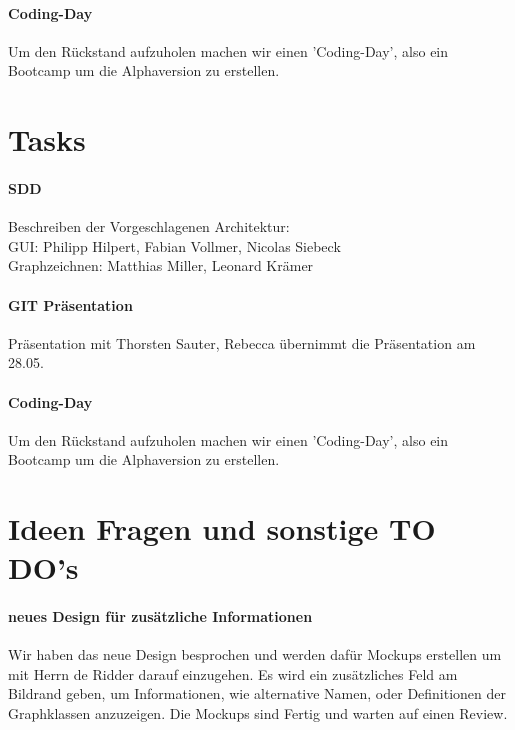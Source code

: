 \documentclass{scrartcl}
\begin{document}
\paragraph{Coding-Day} Um den Rückstand aufzuholen machen wir einen 'Coding-Day', also ein Bootcamp um die Alphaversion zu erstellen.
\section{Tasks}
\paragraph{SDD} Beschreiben der Vorgeschlagenen Architektur: \\ GUI: Philipp Hilpert, Fabian Vollmer, Nicolas Siebeck\\ 
Graphzeichnen: Matthias Miller, Leonard Krämer

\paragraph{GIT Präsentation} Präsentation mit Thorsten Sauter, Rebecca übernimmt die Präsentation am 28.05.
\paragraph{Coding-Day} Um den Rückstand aufzuholen machen wir einen 'Coding-Day', also ein Bootcamp um die Alphaversion zu erstellen.
\section{Ideen Fragen und sonstige TO DO's}
\paragraph{neues Design für zusätzliche Informationen} Wir haben das neue Design besprochen und werden dafür Mockups erstellen um mit Herrn de Ridder darauf einzugehen. Es wird ein zusätzliches Feld am Bildrand geben, um Informationen, wie alternative Namen, oder Definitionen der Graphklassen anzuzeigen. Die Mockups sind Fertig und warten auf einen Review.
\end{document}
